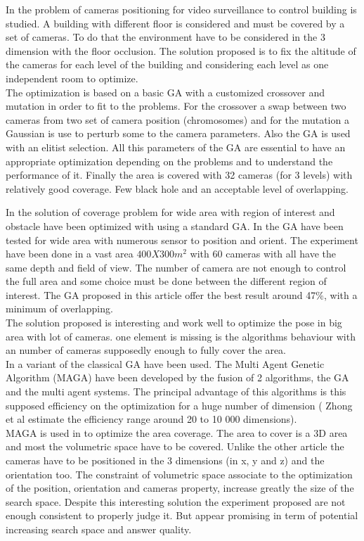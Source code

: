In \cite{83*van2009} the problem of cameras positioning for video surveillance to control building is studied.  A building with different floor is considered and must be covered by a set of cameras. To do that the environment have to be considered in the 3 dimension with the floor occlusion. The solution proposed is to fix the altitude of the cameras for each level of the building and considering each level as one independent room to  optimize. \\
The optimization is based on a basic GA with a customized crossover and mutation in order to fit to the problems. For the crossover a swap between two cameras from two set of camera position (chromosomes) and for the mutation a Gaussian is use to perturb some to the camera parameters.  Also the GA is used with an elitist selection. All this parameters of the GA are essential to have an appropriate optimization depending on the problems and to understand the performance of it.  
Finally the area is covered with 32 cameras (for 3 levels) with relatively good coverage. Few black hole and an acceptable level of overlapping. 

In \cite{165*jiang2010} the solution of coverage problem for wide area with region of interest and obstacle have been optimized with using a standard GA.  In \cite{165*jiang2010} the GA have been tested for wide area with numerous sensor to position and orient. The experiment have been done in a vast area $400X300m^2$ with 60 cameras with all have the same depth and field of view. The number of camera are not enough to control the full area and some choice must be done between the different region of interest. The GA proposed in this article offer the best result around 47\%, with a minimum of overlapping. \\
The solution proposed is interesting and work well to optimize the pose in big area with  lot of cameras. one element is missing is the algorithms behaviour with an number of cameras supposedly enough to fully  cover the area.\\

In \cite{152*wang2009} a variant of the classical GA have been used. The Multi Agent Genetic Algorithm (MAGA) \cite{223*zhong2004} have been developed by the fusion of 2 algorithms, the GA and the multi agent systems. The principal advantage of this algorithms is this supposed efficiency on the optimization for a huge number of dimension ( Zhong et al  estimate the efficiency range around 20 to 10 000 dimensions).\\
MAGA is used in \cite{152*wang2009} to optimize the area coverage. The area to cover is a 3D area and most the volumetric space have to be covered.  Unlike the other article the cameras have to be positioned in the 3 dimensions (in x, y and z) and the orientation too. The constraint of volumetric space associate to the optimization of the position, orientation and cameras property, increase greatly the size of the search space.  
Despite this interesting solution the experiment proposed are not enough consistent to properly judge it. But appear promising  in term of  potential increasing search space and answer quality. 

